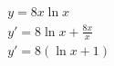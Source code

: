 \begin{ex}
\begin{align}
&y=8x\ln{x}\nonumber\\
&y'=8\ln{x}+\frac{8x}{x}\nonumber\\
&y'=8(\ln{x}+1)\nonumber
\end{align}
\end{ex}